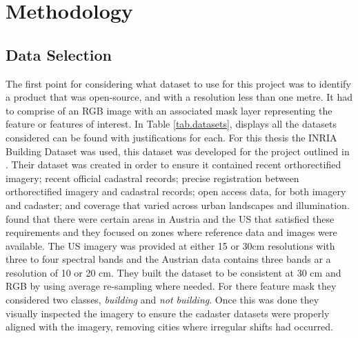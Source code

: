 \chapter{Methodology}

\section{Data Selection}
The first point for considering what dataset to use for this project was to identify a product that was open-source, and with a resolution less than one metre. It had to comprise of an RGB image with an associated mask layer representing the feature or features of interest. In \cite{Richmond19b} Table \ref{tab.datasets}, displays all the datasets considered can be found with justifications for each. For this thesis the INRIA Building Dataset was used, this dataset was developed for the project outlined in \cite{maggiori17a}. Their dataset was created in order to ensure it contained recent orthorectified imagery; recent official cadastral records; precise registration between orthorectified imagery and cadastral records; open access data, for both imagery and cadaster; and coverage that varied across urban landscapes and illumination. \cite{maggiori17a} found that there were certain areas in Austria and the US that satisfied these requirements and they focused on zones where reference data and images were available. The US imagery was provided at either 15 or 30cm resolutions with three to four spectral bands and the Austrian data contains three bands ar a resolution of 10 or 20 cm. They built the dataset to be consistent at 30 cm and RGB by using average re-sampling where needed. For there feature mask they considered two classes, \textit{building} and \textit{not building}. Once this was done they visually inspected the imagery to ensure the cadaster datasets were properly aligned with the imagery, removing cities where irregular shifts had occurred. 


